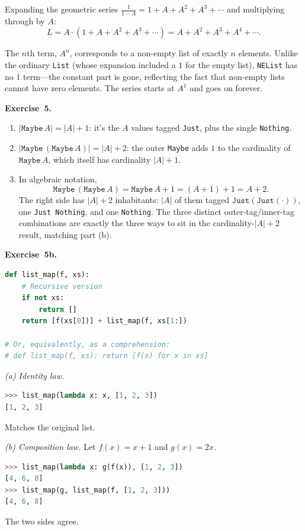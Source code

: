 \documentclass[11pt]{article}
\begin{document}
Expanding the geometric series $\frac{1}{1 - A} = 1 + A + A^2 + A^3 +
\cdots$ and multiplying through by $A$:
\[
  L = A \cdot (1 + A + A^2 + A^3 + \cdots)
    = A + A^2 + A^3 + A^4 + \cdots.
\]

The $n$th term, $A^n$, corresponds to a non-empty list of exactly $n$
elements.  Unlike the ordinary \texttt{List} (whose expansion included
a $1$ for the empty list), \texttt{NEList} has no $1$ term---the
constant part is gone, reflecting the fact that non-empty lists
cannot have zero elements.  The series starts at $A^1$ and goes on
forever.

\medskip
\textbf{Exercise~5.}
\begin{enumerate}[label=(\alph*)]
  \item $|\texttt{Maybe}\,A| = |A| + 1$: it's the $A$ values tagged
        \texttt{Just}, plus the single \texttt{Nothing}.
  \item $|\texttt{Maybe}\,(\texttt{Maybe}\,A)| = |A| + 2$: the outer
        \texttt{Maybe} adds $1$ to the cardinality of
        $\texttt{Maybe}\,A$, which itself has cardinality $|A| + 1$.
  \item In algebraic notation,
        \[
          \texttt{Maybe}\,(\texttt{Maybe}\,A)
            = \texttt{Maybe}\,A + 1
            = (A + 1) + 1
            = A + 2.
        \]
        The right side has $|A| + 2$ inhabitants: $|A|$ of them tagged
        $\texttt{Just}(\texttt{Just}(\cdot))$, one \texttt{Just
        Nothing}, and one \texttt{Nothing}.  The three distinct
        outer-tag/inner-tag combinations are exactly the three ways to
        sit in the cardinality-$|A|+2$ result, matching part (b).
\end{enumerate}

\medskip
\textbf{Exercise~5b.}
\begin{lstlisting}[language=Python]
def list_map(f, xs):
    # Recursive version
    if not xs:
        return []
    return [f(xs[0])] + list_map(f, xs[1:])

# Or, equivalently, as a comprehension:
# def list_map(f, xs): return [f(x) for x in xs]
\end{lstlisting}

\emph{(a) Identity law.}
\begin{lstlisting}[language=Python]
>>> list_map(lambda x: x, [1, 2, 3])
[1, 2, 3]
\end{lstlisting}
Matches the original list.  \checkmark

\emph{(b) Composition law.}  Let $f(x) = x + 1$ and $g(x) = 2x$.
\begin{lstlisting}[language=Python]
>>> list_map(lambda x: g(f(x)), [1, 2, 3])
[4, 6, 8]
>>> list_map(g, list_map(f, [1, 2, 3]))
[4, 6, 8]
\end{lstlisting}
The two sides agree.  \checkmark
\end{document}
